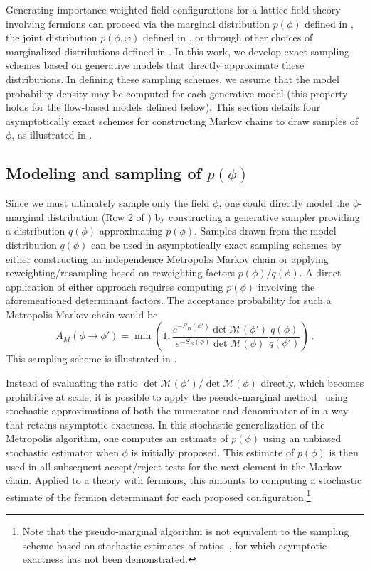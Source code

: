 \documentclass[aps,prd,twocolumn,nofootinbib,superscriptaddress,preprintnumbers]{revtex4-1}
\begin{document}
Generating importance-weighted field configurations for a lattice field theory involving fermions can proceed via the marginal distribution $p(\phi)$ defined in , the joint distribution $p(\phi,\varphi)$ defined in , or through other choices of marginalized distributions defined in . In this work, we develop exact sampling schemes based on generative models that directly approximate these distributions. In defining these sampling schemes, we assume that the model probability density may be computed for each generative model (this property holds for the flow-based models defined below). This section details four asymptotically exact schemes for constructing Markov chains to draw samples of $\phi$, as illustrated in .


\subsection{Modeling and sampling of \texorpdfstring{$p(\phi)$}{p(phi)}}
\label{sec:phi-marginal-sampling}

Since we must ultimately sample only the field $\phi$, one could directly model the $\phi$-marginal distribution (Row 2 of ) by constructing a generative sampler providing a distribution $q(\phi)$ approximating $p(\phi)$. Samples drawn from the model distribution $q(\phi)$ can be used in asymptotically exact sampling schemes by either constructing an independence Metropolis Markov chain or applying reweighting/resampling based on reweighting factors $p(\phi)/q(\phi)$. A direct application of either approach requires computing $p(\phi)$ involving the aforementioned determinant factors. The acceptance probability for such a Metropolis Markov chain would be
%
\begin{equation}\label{eq:marginal-acc-exact}
    A_M(\phi \rightarrow \phi') = \min\left(1, \frac{e^{-S_B(\phi')} \det \mathcal{M}(\phi')}{e^{-S_B(\phi)} \det \mathcal{M}(\phi)}\frac{q(\phi)}{ q(\phi')}\right)\ .
\end{equation}
%
This sampling scheme is illustrated in . 

Instead of evaluating the ratio $\det \mathcal{M}(\phi') / \det \mathcal{M}(\phi)$ directly, which becomes prohibitive at scale, it is possible to apply the pseudo-marginal method~\cite{Andrieu:2009} using stochastic approximations of both the numerator and denominator of  in a way that retains asymptotic exactness. In this stochastic generalization of the Metropolis algorithm, one computes an estimate of $p(\phi)$ using an unbiased stochastic estimator when $\phi$ is initially proposed. This estimate of $p(\phi)$ is then used in all subsequent accept/reject tests for the next element in the Markov chain. Applied to a theory with fermions, this amounts to computing a stochastic estimate of the fermion determinant for each proposed configuration.\footnote{Note that the pseudo-marginal algorithm is not equivalent to the sampling scheme based on stochastic estimates of ratios~\cite{Gattringer:2010zz,Bhanot:1983uy}, for which asymptotic exactness has not been demonstrated.}
\end{document}
